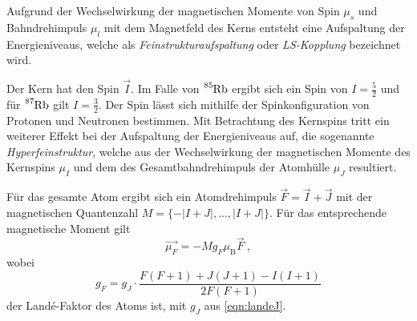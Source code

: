     Aufgrund der Wechselwirkung der magnetischen Momente von Spin $\mu_s$ und Bahndrehimpuls $\mu_l$ mit dem Magnetfeld des Kerns entsteht eine Aufspaltung der Energieniveaus,
    welche als \textit{Feinstrukturaufspaltung} oder \textit{LS-Kopplung} bezeichnet wird.

    Der Kern hat den Spin $\vec{I}$.
    Im Falle von $\ce{^{85}Rb}$ ergibt sich ein Spin von $I = \frac{5}{2}$ und für $\ce{^{87}Rb}$ gilt $I = \frac{3}{2}$.
    Der Spin lässt sich mithilfe der Spinkonfiguration von Protonen und Neutronen bestimmen.
    Mit Betrachtung des Kernspins tritt ein weiterer Effekt bei der Aufspaltung der Energieniveaus auf,
    die sogenannte \textit{Hyperfeinstruktur},
    welche aus der Wechselwirkung der magnetischen Momente des Kernspins $\mu_I$ und dem des Gesamtbahndrehimpuls der Atomhülle $\mu_J$ resultiert.

    Für das gesamte Atom ergibt sich ein Atomdrehimpuls $\vec{F} = \vec{I} + \vec{J}$ mit der magnetischen Quantenzahl $M = \{-\lvert I+J \rvert, ..., \lvert I+J \rvert\}$.
    Für das entsprechende magnetische Moment gilt
    \begin{equation}
        \vec{\mu_F} = - M g_F \mu_\text{B} \vec{F} \ ,
    \end{equation}
    wobei
    \begin{equation}
        g_F = g_J \cdot \frac{F(F+1) + J(J+1) - I(I+1)}{2F(F+1)}
        \label{eqn:landeF}
    \end{equation}
    der Landé-Faktor des Atoms ist,
    mit $g_J$ aus \autoref{eqn:landeJ}.

